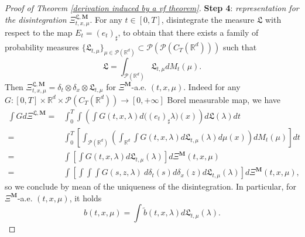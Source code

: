 \documentclass[10pt,leqno]{amsart}
\numberwithin{equation}{section}
\newcommand{\R}{\mathbb{R}}
\newcommand{\PP}{\mathcal{P}}
\begin{document}
\begin{proof}[Proof of Theorem \ref{derivation induced by a vf theorem}]
    \textbf{Step 4}: \textit{representation for the disintegration} $\Xi^{\mathfrak{L},\boldsymbol{M}}_{t,x,\mu}$. For any $t\in [0,T]$, disintegrate the measure $\mathfrak{L}$ with respect to the map $E_t= (e_t)_\sharp $, to obtain that there exists a family of probability measures $\{\mathfrak{L}_{t,\mu}\}_{\mu\in \PP(\R^d)}\subset \PP(\PP(C_T(\R^d)))$ such that 
    \[\mathfrak{L} = \int_{\PP(\R^d)} \mathfrak{L}_{t,\mu} dM_t(\mu).\]
    Then $\Xi^{\mathfrak{L},\boldsymbol{M}}_{t,x,\mu} = \delta_t\otimes \delta_x \otimes \mathfrak{L}_{t,\mu}$ for $\Xi^{\boldsymbol{M}}$-a.e. $(t,x,\mu)$. Indeed for any $G:[0,T]\times \R^d \times \PP(C_T(\R^d))\to [0,+\infty]$ Borel measurable map, we have
    \begin{align*}
        \int G d\Xi^{\mathfrak{L},\boldsymbol{M}} 
        = &
        \int_0^T \int \left( \int G(t,x,\lambda) d\big((e_t)_\sharp \lambda\big)(x) \right) d\mathfrak{L}(\lambda) dt
        \\
        = &
        \int_0^T \left[ \int_{\PP(\R^d)} \left( 
        \int_{\R^d} \int G(t,x,\lambda) d\mathfrak{L}_{t,\mu}(\lambda) d\mu(x) \right) dM_t(\mu)\right] dt
        \\
        = &
        \int \left[ \int G(t,x,\lambda) d\mathfrak{L}_{t,\mu}(\lambda) \right] d\Xi^{\boldsymbol{M}}(t,x,\mu) 
        \\
        = &
        \int \left[\int \int \int G(s,z,\lambda) \ d\delta_t(s) d\delta_x(z) d\mathfrak{L}_{t,\mu}(\lambda)\right] d\Xi^{\boldsymbol{M}}(t,x,\mu),
    \end{align*}
    so we conclude by mean of the uniqueness of the disintegration. In particular, for $\Xi^{\boldsymbol{M}}$-a.e. $(t,x,\mu)$, it holds
    \begin{equation}\label{repr vf with new disintegration}
        b(t,x,\mu) = \int \tilde{b}(t,x,\lambda) d\mathfrak{L}_{t,\mu}(\lambda).
    \end{equation}
    


\end{proof}
\end{document}

